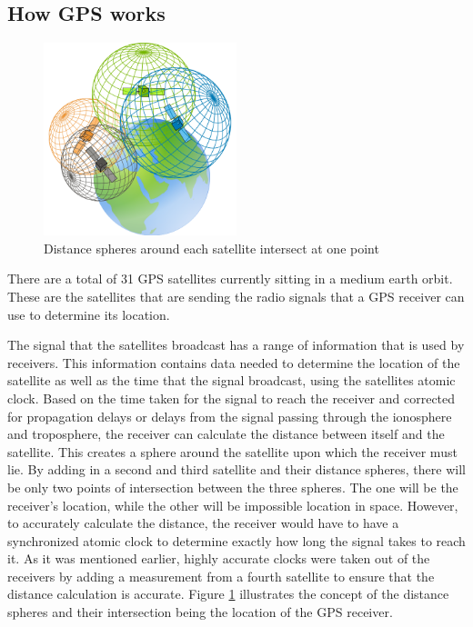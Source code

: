 \subsection{How GPS works}
\begin{figure}
	\begin{center}
		\includegraphics[width = 0.5\textwidth]{figures/GPStriangle.png}
		\caption{Distance spheres around each satellite intersect at one point}
		\label{fig:2:tiangleGPS}
	\end{center}
\end{figure}
There are a total of 31 GPS satellites currently sitting in a medium earth orbit. These are the satellites that are sending the radio signals that a GPS receiver can use to determine its location.\par
\vspace{0.6cm}
The signal that the satellites broadcast has a range of information that is used by receivers. This information contains data needed to determine the location of the satellite as well as the time that the signal broadcast, using the satellites atomic clock. Based on the time taken for the signal to reach the receiver and corrected for propagation delays or delays from the signal passing through the ionosphere and troposphere, the receiver can calculate the distance between itself and the satellite. This creates a sphere around the satellite upon which the receiver must lie. By adding in a second and third satellite and their distance spheres, there will be only two points of intersection between the three spheres. The one will be the receiver's location, while the other will be impossible location in space. However, to accurately calculate the distance, the receiver would have to have a synchronized atomic clock to determine exactly how long the signal takes to reach it. As it was mentioned earlier, highly accurate clocks were taken out of the receivers by adding a measurement from a fourth satellite to ensure that the distance calculation is accurate. Figure \ref{fig:2:tiangleGPS} illustrates the concept of the distance spheres and their intersection being the location of the GPS receiver. \cite{FederalAviationAdministration}
